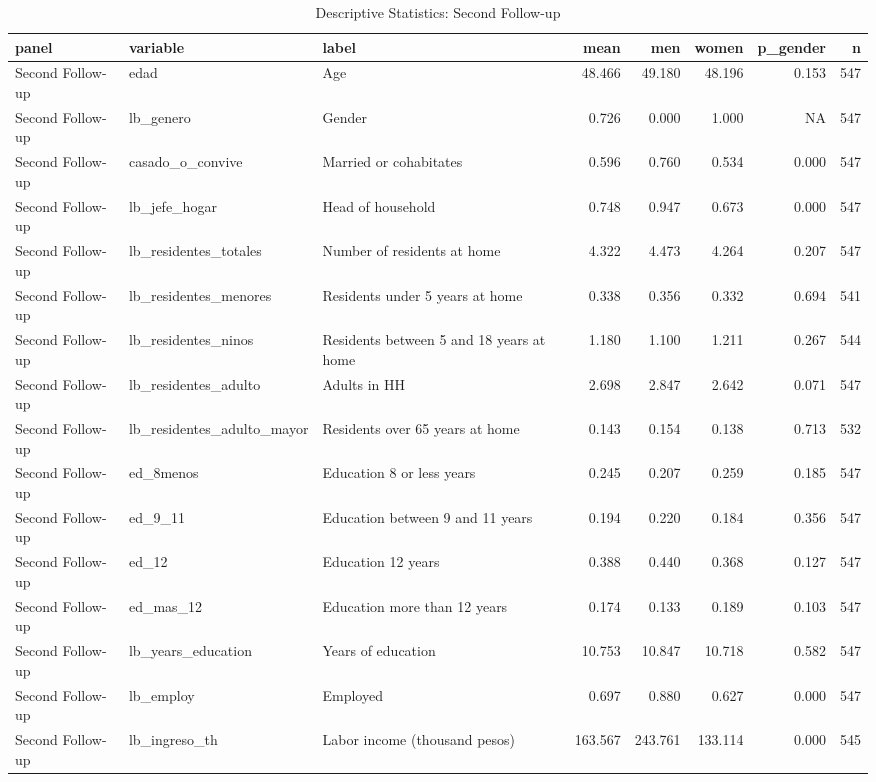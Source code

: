 \begin{table}

\caption{Descriptive Statistics: Second Follow-up}
\centering
\begin{tabular}[t]{lllrrrrr}
\toprule
panel & variable & label & mean & men & women & p\_gender & n\\
\midrule
Second Follow-up & edad & Age & 48.466 & 49.180 & 48.196 & 0.153 & 547\\
Second Follow-up & lb\_genero & Gender & 0.726 & 0.000 & 1.000 & NA & 547\\
Second Follow-up & casado\_o\_convive & Married or cohabitates & 0.596 & 0.760 & 0.534 & 0.000 & 547\\
Second Follow-up & lb\_jefe\_hogar & Head of household & 0.748 & 0.947 & 0.673 & 0.000 & 547\\
Second Follow-up & lb\_residentes\_totales & Number of residents at home & 4.322 & 4.473 & 4.264 & 0.207 & 547\\
\addlinespace
Second Follow-up & lb\_residentes\_menores & Residents under 5 years at home & 0.338 & 0.356 & 0.332 & 0.694 & 541\\
Second Follow-up & lb\_residentes\_ninos & Residents between 5 and 18 years at home & 1.180 & 1.100 & 1.211 & 0.267 & 544\\
Second Follow-up & lb\_residentes\_adulto & Adults in HH & 2.698 & 2.847 & 2.642 & 0.071 & 547\\
Second Follow-up & lb\_residentes\_adulto\_mayor & Residents over 65 years at home & 0.143 & 0.154 & 0.138 & 0.713 & 532\\
Second Follow-up & ed\_8menos & Education 8 or less years & 0.245 & 0.207 & 0.259 & 0.185 & 547\\
\addlinespace
Second Follow-up & ed\_9\_11 & Education between 9 and 11 years & 0.194 & 0.220 & 0.184 & 0.356 & 547\\
Second Follow-up & ed\_12 & Education 12 years & 0.388 & 0.440 & 0.368 & 0.127 & 547\\
Second Follow-up & ed\_mas\_12 & Education more than 12 years & 0.174 & 0.133 & 0.189 & 0.103 & 547\\
Second Follow-up & lb\_years\_education & Years of education & 10.753 & 10.847 & 10.718 & 0.582 & 547\\
Second Follow-up & lb\_employ & Employed & 0.697 & 0.880 & 0.627 & 0.000 & 547\\
\addlinespace
Second Follow-up & lb\_ingreso\_th & Labor income (thousand pesos) & 163.567 & 243.761 & 133.114 & 0.000 & 545\\

\end{tabular}
\end{table}
